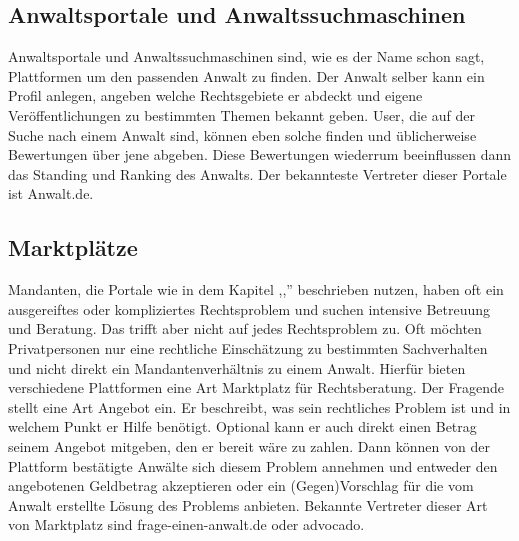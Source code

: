 \subsection{Anwaltsportale und Anwaltssuchmaschinen} \label{Anwaltsportale}
Anwaltsportale und Anwaltssuchmaschinen sind, wie es der Name schon sagt, Plattformen um den passenden Anwalt zu finden. Der Anwalt selber kann ein Profil anlegen, angeben welche Rechtsgebiete er abdeckt und eigene Veröffentlichungen zu bestimmten Themen bekannt geben. User, die auf der Suche nach einem Anwalt sind, können eben solche finden und üblicherweise Bewertungen über jene abgeben. Diese Bewertungen wiederrum beeinflussen dann das Standing und Ranking des Anwalts. Der bekannteste Vertreter dieser Portale ist Anwalt.de.

\subsection{Marktplätze}
Mandanten, die Portale wie in dem Kapitel ,,'' beschrieben nutzen, haben oft ein ausgereiftes oder kompliziertes Rechtsproblem und suchen intensive Betreuung und Beratung. Das trifft aber nicht auf jedes Rechtsproblem zu. Oft möchten Privatpersonen nur eine rechtliche Einschätzung zu bestimmten Sachverhalten und nicht direkt ein Mandantenverhältnis zu einem Anwalt. Hierfür bieten verschiedene Plattformen eine Art Marktplatz für Rechtsberatung. Der Fragende stellt eine Art Angebot ein. Er beschreibt, was sein rechtliches Problem ist und in welchem Punkt er Hilfe benötigt. Optional kann er auch direkt einen Betrag seinem Angebot mitgeben, den er bereit wäre zu zahlen. Dann können von der Plattform bestätigte Anwälte sich diesem Problem annehmen und entweder den angebotenen Geldbetrag akzeptieren oder ein (Gegen)Vorschlag für die vom Anwalt erstellte Lösung des Problems anbieten. Bekannte Vertreter dieser Art von Marktplatz sind frage-einen-anwalt.de oder advocado.

